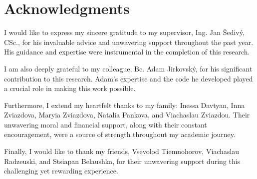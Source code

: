 
\section*{Acknowledgments}

I would like to express my sincere gratitude to my supervisor, Ing. Jan Šedivý, CSc., for his invaluable advice and unwavering support throughout the past year.
His guidance and expertise were instrumental in the completion of this research.

I am also deeply grateful to my colleague, Bc. Adam Jirkovský, for his significant contribution to this research.
Adam's expertise and the code he developed played a crucial role in making this work possible.

Furthermore, I extend my heartfelt thanks to my family: Inessa Davtyan, Inna Zviazdova, Maryia Zviazdova, Natalia Pankova, and Viachaslau Zviazdou.
Their unwavering moral and financial support, along with their constant encouragement, were a source of strength throughout my academic journey.

Finally, I would like to thank my friends, Vsevolod Tiemnohorov, Viachaslau Radzeuski, and Stsiapan Belaushka, for their unwavering support during this challenging yet rewarding experience.

\vspace{2.5cm}
